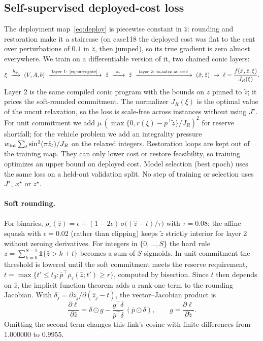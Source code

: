 \documentclass[10pt]{article}
\begin{document}
\subsection{Self-supervised deployed-cost loss}
\label{sec:loss}
The deployment map~\eqref{eq:deploy} is piecewise constant in $\hat z$: rounding and restoration make it a staircase (on case118 the deployed cost was flat to the cent over perturbations of $0.1$ in $\hat z$, then jumped), so its true gradient is zero almost everywhere.
We train on a differentiable version of it, two chained conic layers:
\begin{equation}
\label{eq:chain}
\xi\ \xrightarrow{h_\phi}\ (V,A,b)\ \xrightarrow{\ \text{layer 1: \eqref{eq:surrogate}}\ }\ \hat z\ \xrightarrow{\ \rho_\tau\ }\ \tilde z\ \xrightarrow{\ \text{layer 2: re-solve at } z=\tilde z\ }\ (\tilde x,\tilde z)\ \to\ \ell=\frac{f(\tilde x,\tilde z;\xi)}{J_R(\xi)}.
\end{equation}
Layer 2 is the same compiled conic program with the bounds on $z$ pinned to $\tilde z$; it prices the soft-rounded commitment.
The normalizer $J_R(\xi)$ is the optimal value of the uncut relaxation, so the loss is scale-free across instances without using $J^\star$.
For unit commitment we add $\mu\,(\max\{0,r(\xi)-\bar p^\top\tilde z\}/J_R)^2$ for reserve shortfall; for the vehicle problem we add an integrality pressure $w_{\rm int}\sum_t\sin^2(\pi\hat z_t)/J_R$ on the relaxed integers.
Restoration loops are kept out of the training map. They can only lower cost or restore feasibility, so training optimizes an upper bound on deployed cost.
Model selection (best epoch) uses the same loss on a held-out validation split.
No step of training or selection uses $J^\star$, $x^\star$ or $z^\star$.

\paragraph{Soft rounding.} For binaries, $\rho_\tau(\hat z)=\epsilon+(1-2\epsilon)\,\sigma\big((\hat z-t)/\tau\big)$ with $\tau=0.08$; the affine squash with $\epsilon=0.02$ (rather than clipping) keeps $\tilde z$ strictly interior for layer 2 without zeroing derivatives. For integers in $\{0,\dots,S\}$ the hard rule $z=\sum_{k=0}^{S-1}\mathbb 1\{\hat z>k+t\}$ becomes a sum of $S$ sigmoids. In unit commitment the threshold is lowered until the soft commitment meets the reserve requirement, $t=\max\{t'\le t_0:\bar p^\top\rho_\tau(\hat z;t')\ge r\}$, computed by bisection. Since $t$ then depends on $\hat z$, the implicit function theorem adds a rank-one term to the rounding Jacobian. With $\delta_j=\partial\tilde z_j/\partial(\hat z_j-t)$, the vector--Jacobian product is
\begin{equation}
\label{eq:rank1}
\frac{\partial \ell}{\partial\hat z}=\delta\odot g-\frac{g^\top\delta}{\bar p^\top\delta}\,(\bar p\odot\delta),\qquad g=\frac{\partial\ell}{\partial\tilde z}.
\end{equation}
Omitting the second term changes this link's cosine with finite differences from $1.000000$ to $0.9955$.
\end{document}
